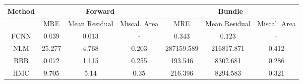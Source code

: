 \documentclass[convert={outext=.png}]{standalone}
\begin{document}
\centering
\label{tab:experimental_results}



\begin{tabular}{c c c c c c c}
\hline
\hline
Method &  \multicolumn{3}{c}{Forward} & \multicolumn{3}{c}{Bundle} \\ \hline
 & MRE & Mean Residual & Miscal. Area & MRE & Mean Residual & Miscal. Area\\
 FCNN & $\mathbf{0.039}$ & $\mathbf{0.013}$ & - & $\mathbf{0.343}$ & $\mathbf{0.123}$ & - \\
 \hline
 NLM & 25.277 & 4.768 & 0.203 & 287159.589 & 216817.871 & 0.412 \\
 BBB & 0.072 & 1.115 & 0.255 & 193.546 & 8302.681 & 0.286 \\
 HMC & 9.705 & 5.14 & 0.35 & 216.396 & 8294.583 & 0.321 \\
\hline
\hline
\end{tabular}
\end{document}
